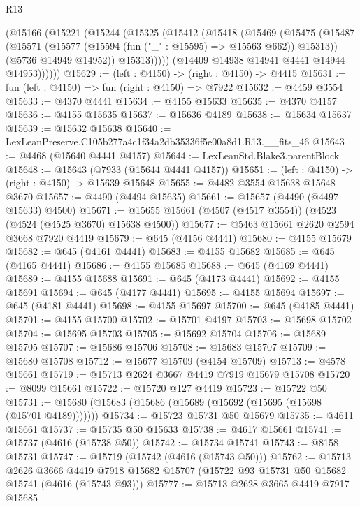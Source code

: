 \begin{lexlean}{R13}
\begin{coremodule}
        (@15166
          (@15221
            (@15244
              (@15325
                (@15412
                  (@15418
                    (@15469
                      (@15475
                        (@15487
                          (@15571 (@15577 (@15594 (fun ("_" : @15595) => @15563 @662)) @15313))
                          (@5736 @14949 @14952))
                        @15313)))))
              (@14409 @14938 @14941 @4441 @14944 @14953))))))
@15629 := (left : @4150) -> (right : @4150) -> @4415
@15631 := fun (left : @4150) => fun (right : @4150) => @7922
@15632 := @4459 @3554
@15633 := @4370 @4441
@15634 := @4155 @15633
@15635 := @4370 @4157
@15636 := @4155 @15635
@15637 := @15636 @4189
@15638 := @15634 @15637
@15639 := @15632 @15638
@15640 := LexLeanPreserve.C105b277a4c1f34a2db35336f5e00a8d1.R13.__fits_46
@15643 := @4468 (@15640 @4441 @4157)
@15644 := LexLeanStd.Blake3.parentBlock
@15648 := @15643 (@7933 (@15644 @4441 @4157))
@15651 := (left : @4150) -> (right : @4150) -> @15639 @15648
@15655 := @4482 @3554 @15638 @15648 @3670
@15657 := @4490 (@4494 @15635)
@15661 := @15657 (@4490 (@4497 @15633) @4500)
@15671 := @15655 @15661 (@4507 (@4517 @3554)) (@4523 (@4524 (@4525 @3670) @15638 @4500))
@15677 := @5463 @15661 @2620 @2594 @3668 @7920 @4419
@15679 := @645 (@4156 @4441)
@15680 := @4155 @15679
@15682 := @645 (@4161 @4441)
@15683 := @4155 @15682
@15685 := @645 (@4165 @4441)
@15686 := @4155 @15685
@15688 := @645 (@4169 @4441)
@15689 := @4155 @15688
@15691 := @645 (@4173 @4441)
@15692 := @4155 @15691
@15694 := @645 (@4177 @4441)
@15695 := @4155 @15694
@15697 := @645 (@4181 @4441)
@15698 := @4155 @15697
@15700 := @645 (@4185 @4441)
@15701 := @4155 @15700
@15702 := @15701 @4197
@15703 := @15698 @15702
@15704 := @15695 @15703
@15705 := @15692 @15704
@15706 := @15689 @15705
@15707 := @15686 @15706
@15708 := @15683 @15707
@15709 := @15680 @15708
@15712 := @15677 @15709 (@4154 @15709)
@15713 := @4578 @15661
@15719 := @15713 @2624 @3667 @4419 @7919 @15679 @15708
@15720 := @8099 @15661
@15722 := @15720 @127 @4419
@15723 := @15722 @50
@15731 := @15680 (@15683 (@15686 (@15689 (@15692 (@15695 (@15698 (@15701 @4189)))))))
@15734 := @15723 @15731 @50 @15679
@15735 := @4611 @15661
@15737 := @15735 @50 @15633
@15738 := @4617 @15661
@15741 := @15737 (@4616 (@15738 @50))
@15742 := @15734 @15741
@15743 := @8158 @15731
@15747 := @15719 (@15742 (@4616 (@15743 @50)))
@15762 := @15713
    @2626
    @3666
    @4419
    @7918
    @15682
    @15707
    (@15722 @93 @15731 @50 @15682 @15741 (@4616 (@15743 @93)))
@15777 := @15713
    @2628
    @3665
    @4419
    @7917
    @15685

\end{coremodule}
\end{lexlean}
